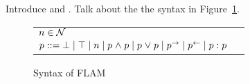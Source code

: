 Introduce \cite{Arden:2015:FA:2859845.2859998} and \cite{SRMMlio}. Talk about the the syntax in Figure~\ref{fig:flam-syntax}.

\begin{figure}[h]
    \centering
    \begin{tabular}{ll}
    $n \in \mathcal{N}$ \\
    $p ::= \bot \mid \top \mid n \mid p \mathrel{\land} p \mid p \mathrel{\lor} p \mid p^{\rightarrow} \mid p^{\leftarrow} \mid p:p$
    \end{tabular}
    \caption{Syntax of FLAM}
    \label{fig:flam-syntax}
\end{figure}